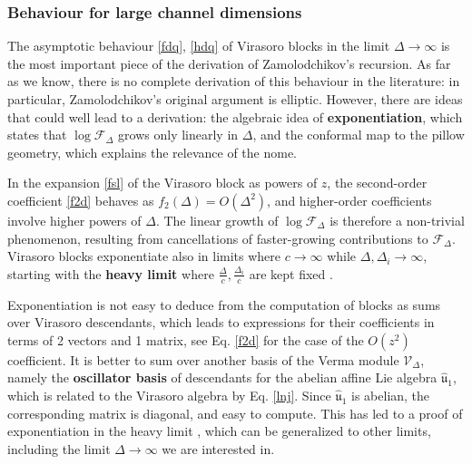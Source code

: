 \documentclass[12pt, a4paper]{article}
\newcommand{\myindex}[1]{\textbf{\boldmath #1}}
\theoremstyle{break}
\begin{document}
\subsubsection{Behaviour for large channel dimensions} \label{sec:bld}

The asymptotic behaviour \eqref{fdq}, \eqref{hdq} of Virasoro blocks in the limit $\Delta\to\infty$ is the most important piece of the derivation of Zamolodchikov's recursion. As far as we know, there is no complete derivation of this behaviour in the literature: in particular, Zamolodchikov's original argument \cite{zam87b} is elliptic. However, there are ideas that could well lead to a derivation: the algebraic idea of \myindex{exponentiation}, which states that $\log\mathcal{F}_\Delta$ grows only linearly in $\Delta$, and the conformal map to the pillow geometry, which explains the relevance of the nome. 

In the expansion \eqref{fsl} of the Virasoro block as powers of $z$, the second-order coefficient \eqref{f2d} behaves as $f_2(\Delta)= O(\Delta^2)$, and higher-order coefficients involve higher powers of $\Delta$. 
The linear growth of $\log\mathcal{F}_\Delta$ is therefore a non-trivial phenomenon, resulting from cancellations of faster-growing contributions to $\mathcal{F}_\Delta$. Virasoro blocks exponentiate also in limits where $c\to\infty$ while $\Delta,\Delta_i\to \infty$, starting with the \myindex{heavy limit} where $\frac{\Delta}{c},\frac{\Delta_i}{c}$ are kept fixed \cite{al24}. 

Exponentiation is not easy to deduce from the computation of blocks as sums over Virasoro descendants, which leads to expressions for their coefficients in terms of 2 vectors and 1 matrix, see Eq. \eqref{f2d} for the case of the $O(z^2)$ coefficient. It is better to sum over another basis of the Verma module $\mathcal{V}_\Delta$, namely the \myindex{oscillator basis} of descendants for the abelian affine Lie algebra $\hat{\mathfrak{u}}_1$, which is related to the Virasoro algebra by Eq. \eqref{lnj}. Since $\hat{\mathfrak{u}}_1$ is abelian, the corresponding matrix is diagonal, and easy to compute. This has led to a proof of exponentiation in the heavy limit \cite{bdk19}, which can be generalized to other limits, including the limit $\Delta\to \infty$ we are interested in. 
\end{document}
